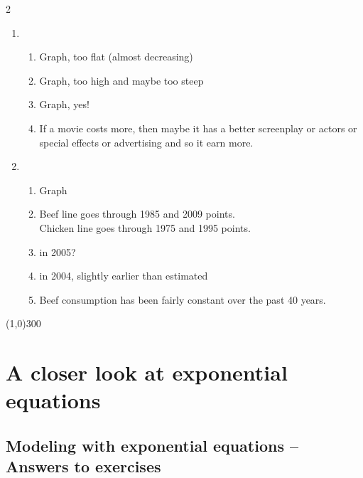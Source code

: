 \begin{multicols} {2}
\begin{enumerate}
\begin{enumerate}
Graph
\item \$733, \$0 I guess (was negative)
\end{enumerate}

\item %
\begin{enumerate}
\item Graph, too flat (almost decreasing)
\item Graph, too high and maybe too steep
\item Graph, yes!
\item If a movie costs more, then maybe it has a better screenplay or actors or special effects or advertising and so it earn more.
\end{enumerate}

\item %
\begin{enumerate}
\item Graph
\item Beef line goes through 1985 and 2009 points. \\
Chicken line goes through 1975 and 1995 points.
\item in 2005?
\item in 2004, slightly earlier than estimated
\item Beef consumption has been fairly constant over the past 40 years.
\end{enumerate}

\end{enumerate}
\end{multicols}

\begin{center}
\line(1,0){300} %
\end{center}


\section{A closer look at exponential equations} %

\bigskip

\subsection {Modeling with exponential equations -- Answers to exercises} %

